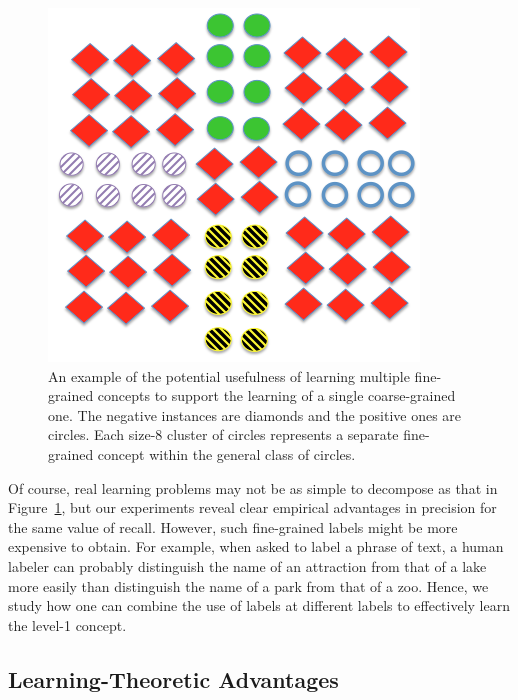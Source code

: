 \begin{figure}[ht]
\vskip 0.2in
\begin{center}
\centerline{\includegraphics[width=\columnwidth]{fig/union.png}}
\caption{ An example of the potential usefulness of learning multiple
fine-grained concepts to support
the learning of a single coarse-grained one.  The negative instances are diamonds and the
positive ones are circles.  Each size-8 cluster of circles represents a separate fine-grained
concept within the general class of circles.}
\label{fig:unionex}
\end{center}
\vskip -0.2in
\end{figure} 

Of course, real learning problems may not be as simple to decompose
as that in Figure~\ref{fig:unionex}, but our experiments reveal
clear empirical advantages in precision for the same value of recall.
However, such fine-grained labels might be more 
expensive to obtain.  For example, when asked to label a phrase
of text, a human labeler can probably distinguish the name of an
attraction from that of a lake more easily than distinguish the
name of a park from that of a zoo.  Hence, we study how one can
combine the use of labels at different labels to effectively learn
the level-1 concept.

\subsection{Learning-Theoretic Advantages}
\label{sec:learningtheory}

